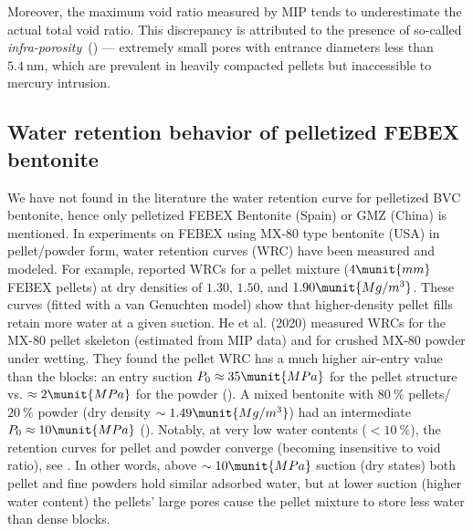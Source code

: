 Moreover, the maximum void ratio measured by MIP tends to underestimate the actual total void ratio. This discrepancy is attributed to the presence of so-called \textit{infra-porosity}~(\cite{delage2008experimental}) --- extremely small pores with entrance diameters less than $5.4~\mathrm{nm}$, which are prevalent in heavily compacted pellets but inaccessible to mercury intrusion.






\subsection{Water retention behavior of pelletized FEBEX bentonite}


We have not found in the literature the water retention curve for pelletized BVC bentonite, hence only pelletized FEBEX Bentonite (Spain) \cite{Mayor2005} or GMZ (China) \cite{Liu2021} is mentioned.
In experiments on FEBEX using MX-80 type bentonite (USA) in pellet/powder form, water retention curves (WRC) have been measured and modeled. For example, \cite{Mayor2005} reported WRCs for a pellet mixture ($4 \munit{mm}$ FEBEX pellets) at dry densities of $1.30$, $1.50$, and $1.90 \munit{Mg/m^3}$. These curves (fitted with a van Genuchten model) show that higher-density pellet fills retain more water at a given suction. He et al. (2020) measured WRCs for the MX-80 pellet skeleton (estimated from MIP data) and for crushed MX-80 powder under wetting. They found the pellet WRC has a much higher air-entry value than the blocks: an entry suction $P_0 \approx 35 \munit{MPa}$ for the pellet structure vs. $\approx 2 \munit{MPa}$ for the powder (\cite{mesa2020microstructural}). A mixed bentonite with $80~\%$ pellets/$20~\%$ powder (dry density $\sim 1.49 \munit{Mg/m^3}$) had an intermediate $P_0 \approx 10 \munit{MPa}$ (\cite{mesa2020microstructural}). Notably, at very low water contents ($<10~\%$), the retention curves for pellet and powder converge (becoming insensitive to void ratio), see \cite{mesa2020microstructural}. In other words, above $\sim 10 \munit{MPa}$ suction (dry states) both pellet and fine powders hold similar adsorbed water, but at lower suction (higher water content) the pellets’ large pores cause the pellet mixture to store less water than dense blocks.


